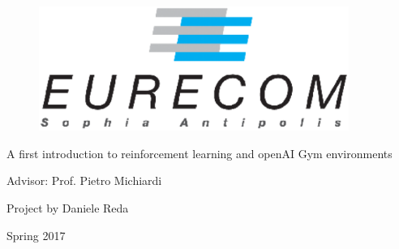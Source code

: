 \clearpage\thispagestyle{empty}
\begin{center}
    \begin{figure}[h]
        \centering
        \includegraphics[width=0.9\textwidth]{./pictures/logo.eps}
    \end{figure}        
    \vspace*{4cm}
    \huge

        A first introduction to reinforcement learning and openAI Gym environments
        
   
    \normalsize


    \vspace*{5.0cm}
    Advisor: Prof. Pietro Michiardi
    
    Project by Daniele Reda

    Spring 2017

\end{center}

